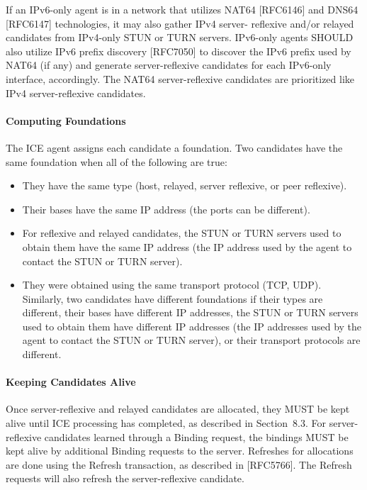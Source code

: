 \documentclass{article}
\begin{document}
If an IPv6-only agent is in a network that utilizes NAT64 [RFC6146] and DNS64 [RFC6147] technologies, it may also gather IPv4 server- reflexive and/or relayed candidates from IPv4-only STUN or TURN servers.  IPv6-only agents SHOULD also utilize IPv6 prefix discovery [RFC7050] to discover the IPv6 prefix used by NAT64 (if any) and generate server-reflexive candidates for each IPv6-only interface, accordingly.  The NAT64 server-reflexive candidates are prioritized like IPv4 server-reflexive candidates.

\paragraph{Computing Foundations}

The ICE agent assigns each candidate a foundation.  Two candidates have the same foundation when all of the following are true:

\begin{itemize}
\item They have the same type (host, relayed, server reflexive, or peer reflexive).
\item Their bases have the same IP address (the ports can be different).
\item For reflexive and relayed candidates, the STUN or TURN servers used to obtain them have the same IP address (the IP address used by the agent to contact the STUN or TURN server).
\item They were obtained using the same transport protocol (TCP, UDP).
Similarly, two candidates have different foundations if their types are different, their bases have different IP addresses, the STUN or TURN servers used to obtain them have different IP addresses (the IP addresses used by the agent to contact the STUN or TURN server), or their transport protocols are different.

\end{itemize}
\paragraph{Keeping Candidates Alive}

Once server-reflexive and relayed candidates are allocated, they MUST be kept alive until ICE processing has completed, as described in Section~8.3.  For server-reflexive candidates learned through a Binding request, the bindings MUST be kept alive by additional Binding requests to the server.  Refreshes for allocations are done using the Refresh transaction, as described in [RFC5766].  The Refresh requests will also refresh the server-reflexive candidate.
\end{document}
